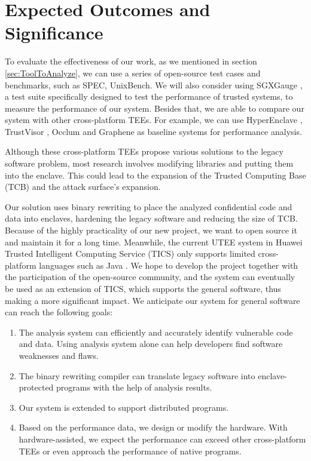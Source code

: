 \section{Expected Outcomes and Significance}
To evaluate the effectiveness of our work, as we mentioned in section
\ref{sec:ToolToAnalyze}, we can use a series of open-source test cases and benchmarks,
such as SPEC, UnixBench.
We will also consider using SGXGauge \cite{Kumar2022ACB}, a test suite specifically
designed to test the performance of trusted systems, to measure the performance
of our system.
Besides that, we are able to compare our system with other cross-platform TEEs.
For example, we can use HyperEnclave \cite{Jia2022HyperEnclaveAO}, TrustVisor
\cite{McCune2010TrustVisorET}, Occlum \cite{Shen2020OcclumSA} and Graphene
\cite{Tsai2017GrapheneSGXAP} as baseline systems for performance analysis.

Although these cross-platform TEEs propose various solutions to the legacy
software problem, most research involves modifying libraries and putting
them into the enclave.
This could lead to the expansion of the Trusted Computing Base (TCB)
and the attack surface's expansion.

Our solution uses binary rewriting to place the analyzed confidential code and data
into enclaves, hardening the legacy software and reducing the size of TCB.
Because of the highly practicality of our new project, we want to open source it and
maintain it for a long time. 
Meanwhile, the current UTEE system in Huawei Trusted Intelligent Computing Service (TICS)
only supports limited cross-platform languages such as Java \cite{Jiang2020UranusSE}.
We hope to develop the project together with the participation of the open-source
community, and the system can eventually be used as an extension of TICS, which supports
the general software, thus making a more significant impact.
We anticipate our system for general software can reach the following goals:
\begin{enumerate}[(1)]
    \item The analysis system can efficiently and accurately identify vulnerable code and data.
    Using analysis system alone can help developers find software weaknesses and flaws.
    \item The binary rewriting compiler can translate legacy software into enclave-protected programs
    with the help of analysis results.
    \item Our system is extended to support distributed programs.
    \item Based on the performance data, we design or modify the hardware.
    With hardware-assisted, we expect the performance can exceed other cross-platform TEEs
    or even approach the performance of native programs.
\end{enumerate}